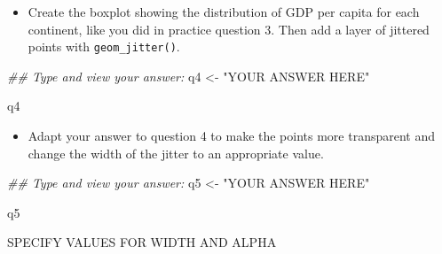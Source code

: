 \documentclass[
  letterpaper,
  DIV=11,
  numbers=noendperiod]{scrreprt}
\newenvironment{Shaded}{\begin{snugshade}}{\end{snugshade}}
\newcommand{\DocumentationTok}[1]{\textcolor[rgb]{0.37,0.37,0.37}{\textit{#1}}}
\newcommand{\NormalTok}[1]{\textcolor[rgb]{0.00,0.23,0.31}{#1}}
\newcommand{\OtherTok}[1]{\textcolor[rgb]{0.00,0.23,0.31}{#1}}
\newcommand{\StringTok}[1]{\textcolor[rgb]{0.13,0.47,0.30}{#1}}
\providecommand{\tightlist}{%
  \setlength{\itemsep}{0pt}\setlength{\parskip}{0pt}}\usepackage{longtable,booktabs,array}
\begin{document}
\begin{tcolorbox}[enhanced jigsaw, colframe=quarto-callout-tip-color-frame, colbacktitle=quarto-callout-tip-color!10!white, titlerule=0mm, opacitybacktitle=0.6, breakable, toprule=.15mm, arc=.35mm, rightrule=.15mm, colback=white, bottomrule=.15mm, opacityback=0, toptitle=1mm, left=2mm, bottomtitle=1mm, title=\textcolor{quarto-callout-tip-color}{\faLightbulb}\hspace{0.5em}{Practice}, leftrule=.75mm, coltitle=black]

\begin{itemize}
\tightlist
\item
  Create the boxplot showing the distribution of GDP per capita for each
  continent, like you did in practice question 3. Then add a layer of
  jittered points with \texttt{geom\_jitter()}.
\end{itemize}

\begin{Shaded}
\begin{Highlighting}[]
\DocumentationTok{\#\# Type and view your answer:}
\NormalTok{q4 }\OtherTok{\textless{}{-}} \StringTok{"YOUR ANSWER HERE"} 
  
\NormalTok{q4}
\end{Highlighting}
\end{Shaded}

\begin{itemize}
\tightlist
\item
  Adapt your answer to question 4 to make the points more transparent
  and change the width of the jitter to an appropriate value.
\end{itemize}

\begin{Shaded}
\begin{Highlighting}[]
\DocumentationTok{\#\# Type and view your answer:}
\NormalTok{q5 }\OtherTok{\textless{}{-}} \StringTok{"YOUR ANSWER HERE"} 
  
\NormalTok{q5}
\end{Highlighting}
\end{Shaded}

SPECIFY VALUES FOR WIDTH AND ALPHA

\end{tcolorbox}
\end{document}
